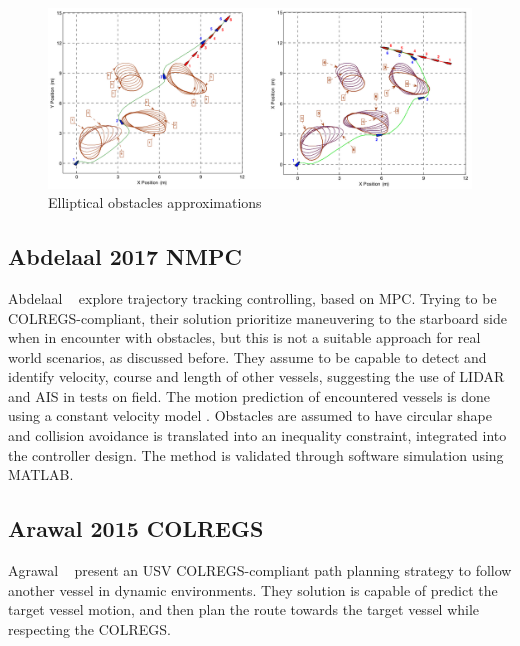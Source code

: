     \begin{figure}[H]
        \centering
        \includegraphics[scale=0.3]{figs/Soltan2009Trajectory_SimulateTests_Ellipsses.png}
        \caption{Elliptical obstacles approximations \cite{Soltan2009Trajectory}}
        \label{fig:Soltan2009Trajectory_SimulateTests_Ellipsses}
    \end{figure}
    
    
    \subsection{Abdelaal 2017 NMPC}
    Abdelaal \etal~\cite{Abdelaal2017NMPC, Abdelaal2018Nonlinear} explore trajectory tracking controlling, based on \ac{MPC}. Trying to be COLREGS-compliant, their solution prioritize maneuvering to the starboard side when in encounter with obstacles, but this is not a suitable approach for real world scenarios, as discussed before. They assume to be capable to detect and identify velocity, course and length of other vessels, suggesting the use of \ac{LIDAR} and \ac{AIS} in tests on field. The motion prediction of encountered vessels is done using a constant velocity model \cite{Rong2003Survey}. Obstacles are assumed to have circular shape and collision avoidance is translated into an inequality constraint, integrated into the controller design. The method is validated through software simulation using MATLAB.
    
    \subsection{Arawal 2015 COLREGS}
    Agrawal \etal~\cite{Agrawal2015COLREGS} present an \ac{USV} COLREGS-compliant path planning strategy to follow another vessel in dynamic environments. They solution is capable of predict the target vessel motion, and then plan the route towards the target vessel while respecting the COLREGS. 
    
